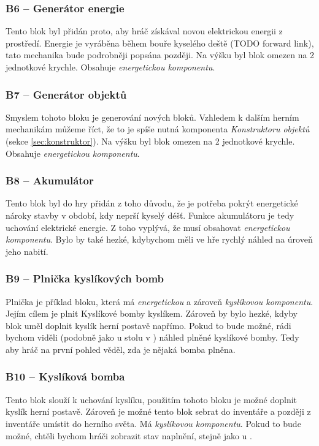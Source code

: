 \subsubsection{B6 -- Generátor energie}
\label{blocks:B6}
Tento blok byl přidán proto, aby hráč získával novou elektrickou energii z prostředí. Energie je vyráběna během bouře kyselého deště (TODO forward link), tato mechanika bude podrobněji popsána později. Na výšku byl blok omezen na 2 jednotkové krychle. Obsahuje \textit{energetickou komponentu}. 


\subsubsection{B7 -- Generátor objektů}
\label{blocks:B7}
Smyslem tohoto bloku je generování nových bloků. Vzhledem k dalším herním mechanikám můžeme říct, že to je spíše nutná komponenta \textit{Konstruktoru objektů} (sekce \ref{sec:konstruktor}). Na výšku byl blok omezen na 2 jednotkové krychle. Obsahuje \textit{energetickou komponentu}.


\subsubsection{B8 -- Akumulátor}
\label{blocks:B8}
Tento blok byl do hry přidán z toho důvodu, že je potřeba pokrýt energetické nároky stavby v období, kdy neprší kyselý déšť. Funkce akumulátoru je tedy uchování elektrické energie. Z toho vyplývá, že musí obsahovat  \textit{energetickou komponentu}. Bylo by také hezké, kdybychom měli ve hře rychlý náhled na úroveň jeho nabití.


\subsubsection{B9 -- Plnička kyslíkových bomb}
\label{blocks:B9}
Plnička je příklad bloku, která má  \textit{energetickou} a zároveň  \textit{kyslíkovou komponentu}. Jejím cílem je plnit  Kyslíkové bomby kyslíkem. Zároveň by bylo hezké, kdyby blok uměl doplnit kyslík herní postavě napřímo. Pokud to bude možné, rádi bychom viděli (podobně jako u stolu v \ME{}) náhled plněné kyslíkové bomby. Tedy aby hráč na první pohled věděl, zda je nějaká bomba plněna.

\subsubsection{B10 -- Kyslíková bomba}
\label{blocks:B10}
Tento blok slouží k uchování kyslíku, použitím tohoto bloku je možné doplnit kyslík herní postavě. Zároveň je možné tento blok sebrat do inventáře a později z inventáře umístit do herního světa. Má \textit{kyslíkovou komponentu}. Pokud to bude možné, chtěli bychom hráči zobrazit stav naplnění, stejně jako u .


